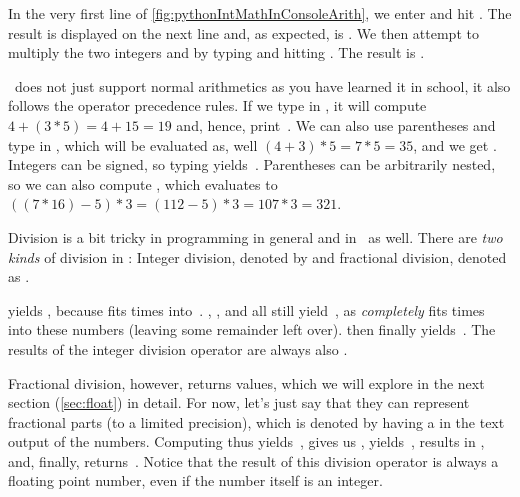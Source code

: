 In the very first line of \cref{fig:pythonIntMathInConsoleArith}, we enter \pythonIdx{+} and hit \keys{\enter}.
The result is displayed on the next line and, as expected, is .
We then attempt to multiply the two integers  and  by typing \pythonIdx{*} and hitting \keys{\enter}.
The result is .

\python\ does not just support normal arithmetics as you have learned it in school, it also follows the operator precedence rules.
If we type in , it will compute $4+(3*5)=4+15=19$\pythonIdx{(}\pythonIdx{)} and, hence, print~.
We can also use parentheses and type in , which will be evaluated as, well $(4+3)*5=7*5=35$, and we get .
Integers can be signed, so typing \pythonIdx{-} yields~.
Parentheses can be arbitrarily nested, so we can also compute , which evaluates to $((7 * 16) - 5) * 3 = (112-5)*3=107*3=321$\pythonIdx{(}\pythonIdx{)}.

Division is a bit tricky in programming in general and in \python\ as well.
There are \emph{two kinds} of division in \python: Integer division, denoted by \pythonilIdx{//} and fractional division, denoted as \pythonilIdx{/}.

 yields , because  fits  times into~.
, , and  all still yield~, as  \emph{completely} fits  times into these numbers (leaving some remainder left over).
 then finally yields~.
The results of the integer division operator \pythonilIdx{//} are always also .

Fractional division, however, returns  values, which we will explore in the next section (\cref{sec:float}) in detail.
For now, let's just say that they can represent fractional parts (to a limited precision), which is denoted by having a  in the text output of the numbers.
Computing  thus yields~,  gives us ,  yields~,  results in , and, finally,  returns~.
Notice that the result of this division operator is always a floating point number, even if the number itself is an integer.

